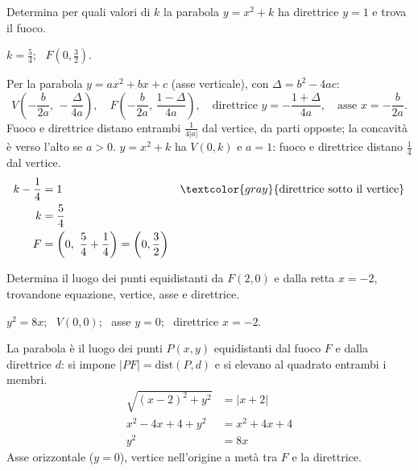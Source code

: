 \begin{question}[ID=1.8, subtitle={Valore di $k$ affinché la parabola $y=x^2+k$ abbia direttrice $y=1$}, difficulty=difficile, tags={parabola, parametrico}]
Determina per quali valori di $k$ la parabola $y=x^2+k$ ha direttrice $y=1$ e trova il fuoco.
\begin{solution}
$k=\tfrac54$; \ $F\left(0,\tfrac32\right)$.
\end{solution}
\begin{explanation}
Per la parabola $y=ax^2+bx+c$ (asse verticale), con $\Delta=b^2-4ac$:
\[ V\left(-\dfrac{b}{2a},\,-\dfrac{\Delta}{4a}\right), \quad F\left(-\dfrac{b}{2a},\,\dfrac{1-\Delta}{4a}\right), \quad \text{direttrice } y=-\dfrac{1+\Delta}{4a}, \quad \text{asse } x=-\dfrac{b}{2a}. \]
Fuoco e direttrice distano entrambi $\tfrac{1}{4|a|}$ dal vertice, da parti opposte; la concavità è verso l'alto se $a>0$.
$y=x^2+k$ ha $V(0,k)$ e $a=1$: fuoco e direttrice distano $\tfrac14$ dal vertice.
\[\begin{aligned}
k-\dfrac14 &= 1 && \textcolor{gray}{\text{direttrice sotto il vertice}}\\
k &= \dfrac54\\
F &= \left(0,\ \dfrac54+\dfrac14\right)=\left(0,\dfrac32\right)
\end{aligned}\]
\end{explanation}
\end{question}


\begin{question}[ID=1.9, subtitle={Luogo equidistante da $F(2,0)$ e dalla retta $x=-2$}, difficulty=difficile, tags={parabola, luogo}]
Determina il luogo dei punti equidistanti da $F(2,0)$ e dalla retta $x=-2$, trovandone equazione, vertice, asse e direttrice.
\begin{solution}
$y^2=8x$; \ $V(0,0)$; \ asse $y=0$; \ direttrice $x=-2$.
\end{solution}
\begin{explanation}
La parabola è il luogo dei punti $P(x,y)$ equidistanti dal fuoco $F$ e dalla direttrice $d$: si impone $|PF|=\text{dist}(P,d)$ e si elevano al quadrato entrambi i membri.
\[\begin{aligned}
\sqrt{(x-2)^2+y^2} &= |x+2|\\
x^2-4x+4+y^2 &= x^2+4x+4\\
y^2 &= 8x
\end{aligned}\]
Asse orizzontale ($y=0$), vertice nell'origine a metà tra $F$ e la direttrice.
\end{explanation}
\end{question}

